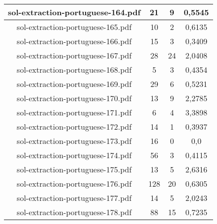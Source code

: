 \documentclass[11pt]{article}
\newlength\mylength
\begin{document}
\begin{center}
\begin{longtable}{||C{.40\mylength}||C{.30\mylength}||C{.30\mylength}||C{.30\mylength}||}
  sol-extraction-portuguese-164.pdf & 21 & 9 & 0,5545 \\  \hline
  sol-extraction-portuguese-165.pdf & 10 & 2 & 0,6135 \\  \hline
  sol-extraction-portuguese-166.pdf & 15 & 3 & 0,3409 \\  \hline
  sol-extraction-portuguese-167.pdf & 28 & 24 & 2,0408 \\  \hline
  sol-extraction-portuguese-168.pdf & 5 & 3 & 0,4354 \\  \hline
  sol-extraction-portuguese-169.pdf & 29 & 6 & 0,5231 \\  \hline
  sol-extraction-portuguese-170.pdf & 13 & 9 & 2,2785 \\  \hline
  sol-extraction-portuguese-171.pdf & 6 & 4 & 3,3898 \\  \hline
  sol-extraction-portuguese-172.pdf & 14 & 1 & 0,3937 \\  \hline
  sol-extraction-portuguese-173.pdf & 16 & 0 & 0,0 \\  \hline
  sol-extraction-portuguese-174.pdf & 56 & 3 & 0,4115 \\  \hline
  sol-extraction-portuguese-175.pdf & 13 & 5 & 2,6316 \\  \hline
  sol-extraction-portuguese-176.pdf & 128 & 20 & 0,6305 \\  \hline
  sol-extraction-portuguese-177.pdf & 14 & 5 & 2,0243 \\  \hline
  sol-extraction-portuguese-178.pdf & 88 & 15 & 0,7235 \\  \hline

\end{longtable}
\end{center}
\end{document}
